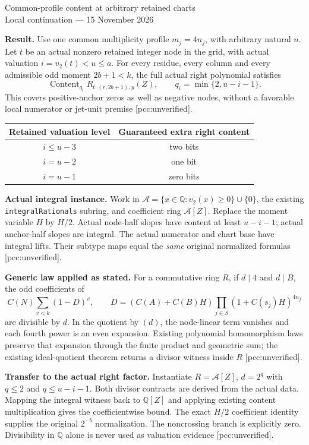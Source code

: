 \documentclass[10pt]{article}
\begin{document}
\begin{center}{\Large Common-profile content at arbitrary retained charts}\\[4pt]
Local continuation --- 15 November 2026\end{center}
\textbf{Result.} Use one common multiplicity profile $m_j=4n_j$, with
arbitrary natural $n$. Let $t$ be an actual nonzero retained integer node
in the grid, with actual valuation $i=v_2(t)<u\le a$. For every residue,
every column and every admissible odd moment $2b+1<k$, the full actual
right polynomial satisfies
\[
 \operatorname{Content}_{q_i} R_{t,(r,2b+1),y}(Z),\qquad
 q_i=\min\{2,u-i-1\}.
\]
This covers positive-anchor zeros as well as negative nodes, without a
favorable local numerator or jet-unit premise [pcc:unverified].

\begin{center}\begin{tabular}{c|c}
Retained valuation level & Guaranteed extra right content\\\hline
$i\le u-3$ & two bits\\
$i=u-2$ & one bit\\
$i=u-1$ & zero bits
\end{tabular}\end{center}

\textbf{Actual integral instance.} Work in
$\mathcal A=\{x\in\mathbb Q:v_2(x)\ge0\}\cup\{0\}$, the existing
\texttt{integralRationals} subring, and coefficient ring $\mathcal A[Z]$.
Replace the moment variable $H$ by $H/2$. Actual node-half slopes have
content at least $u-i-1$; actual anchor-half slopes are integral.
The actual numerator and chart base have integral lifts. Their subtype
maps equal the \emph{same} original normalized formulas
[pcc:unverified].

\textbf{Generic law applied as stated.} For a commutative ring $R$, if
$d\mid4$ and $d\mid B$, the odd coefficients of
\[
 C(N)\sum_{v<k}(1-D)^v,\qquad
 D=(C(A)+C(B)H)\prod_{j\in S}(1+C(s_j)H)^{4n_j}
\]
are divisible by $d$. In the quotient by $(d)$, the node-linear term
vanishes and each fourth power is an even expansion. Existing polynomial
homomorphism laws preserve that expansion through the finite product and
geometric sum; the existing ideal-quotient theorem returns a divisor
witness inside $R$ [pcc:unverified].

\textbf{Transfer to the actual right factor.} Instantiate
$R=\mathcal A[Z]$, $d=2^q$ with $q\le2$ and $q\le u-i-1$.
Both divisor contracts are derived from the actual data. Mapping the
integral witness back to $\mathbb Q[Z]$ and applying existing content
multiplication gives the coefficientwise bound. The exact $H/2$
coefficient identity supplies the original $2^{-b}$ normalization.
The noncrossing branch is explicitly zero. Divisibility in
$\mathbb Q$ alone is never used as valuation evidence [pcc:unverified].
\end{document}
